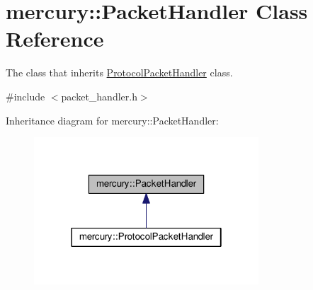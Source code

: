 \hypertarget{classmercury_1_1_packet_handler}{}\section{mercury\+:\+:Packet\+Handler Class Reference}
\label{classmercury_1_1_packet_handler}


The class that inherits \hyperlink{classmercury_1_1_protocol_packet_handler}{Protocol\+Packet\+Handler} class.  




{\ttfamily \#include $<$packet\+\_\+handler.\+h$>$}



Inheritance diagram for mercury\+:\+:Packet\+Handler\+:\nopagebreak
\begin{figure}[H]
\begin{center}
\leavevmode
\includegraphics[width=238pt]{classmercury_1_1_packet_handler__inherit__graph}
\end{center}
\end{figure}
